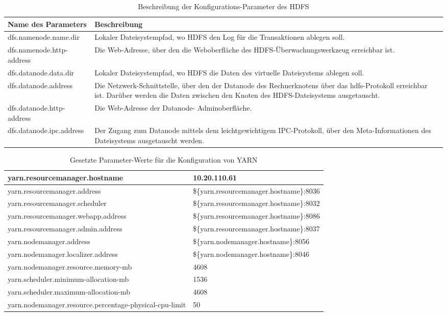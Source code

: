 \begin{appendices}
\begin{table}
	\begin{tabularx}{\textwidth}{|X|X|} \hline
		Name des Parameters & Beschreibung \\ \hline
		dfs.namenode.name.dir & Lokaler Dateisystempfad, wo
		HDFS den Log für die Transaktionen ablegen soll. \\ \hline
		dfs.namenode.http-address & Die Web-Adresse, über den die
		Weboberfläche des HDFS-Überwachungswerkzeug erreichbar ist. \\ \hline
		dfs.datanode.data.dir & Lokaler Dateisystempfad, wo HDFS
		die Daten des virtuelle Dateisystems ablegen soll. \\ \hline
		dfs.datanode.address & Die Netzwerk-Schnittstelle, über den 
		der Datanode des Rechnerknotens über das hdfs-Protokoll erreichbar ist. Darüber 
		werden die Daten zwischen den Knoten des HDFS-Dateisystems ausgetauscht. \\ \hline
		dfs.datanode.http-address & Die Web-Adresse der Datanode-
		Adminoberfläche. \\ \hline
		dfs.datanode.ipc.address & Der Zugang zum Datanode mittels dem
		leichtgewichtigem IPC-Protokoll, über den Meta-Informationen des Dateisystems 
		ausgetauscht werden. \\ \hline
	\end{tabularx}
	\caption{Beschreibung der Konfigurations-Parameter des HDFS}
	\label{config:hdfsDescription}
\end{table}

\begin{table}
	\begin{tabularx}{\textwidth}{| X | X |} \hline
	yarn.resourcemanager.hostname & 10.20.110.61 \\ \hline
	yarn.resourcemanager.address & \$\{yarn.resourcemanager.hostname\}:8036 \\ \hline
	yarn.resourcemanager.scheduler & \$\{yarn.resourcemanager.hostname\}:8032 \\ \hline
	yarn.resourcemanager.webapp.address & \$\{yarn.resourcemanager.hostname\}:8086 \\ \hline
	yarn.resourcemanager.admin.address & \$\{yarn.resourcemanager.hostname\}:8037 \\ \hline
	yarn.nodemanager.address & \$\{yarn.nodemanager.hostname\}:8056 \\ \hline
	yarn.nodemanager.localizer.address & \$\{yarn.nodemanager.hostname\}:8046 \\ \hline
	yarn.nodemanager.resource.memory-mb & 4608 \\ \hline
	yarn.scheduler.minimum-allocation-mb & 1536 \\ \hline
	yarn.scheduler.maximum-allocation-mb & 4608 \\ \hline
	yarn.nodemanager.resource.percentage-physical-cpu-limit & 50 \\ \hline
	\end{tabularx}
	\caption{Gesetzte Parameter-Werte für die Konfiguration von YARN}
	\label{config:yarnValues}
\end{table}


\end{appendices}
